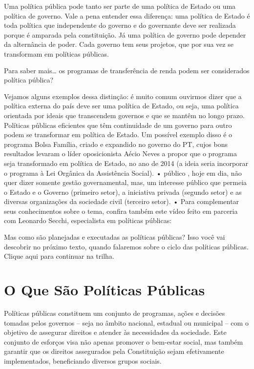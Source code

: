 \documentclass[
   article,       
   12pt,          
   oneside,       
   a4paper,       
   english,       
   brazil,        
   sumario=tradicional
   ]{abntex2}
\begin{document}
Uma política pública pode tanto ser parte de uma política de Estado ou uma política de governo. Vale a pena entender essa diferença: uma política de Estado é toda política que independente do governo e do governante deve ser realizada porque é amparada pela constituição. Já uma política de governo pode depender da alternância de poder. Cada governo tem seus projetos, que por sua vez se transformam em políticas públicas.

Para saber mais… os programas de transferência de renda podem ser considerados política pública?

Vejamos alguns exemplos dessa distinção: é muito comum ouvirmos dizer que a política externa do país deve ser uma política de Estado, ou seja, uma política orientada por ideais que transcendem governos e que se mantêm no longo prazo. Políticas públicas eficientes que têm continuidade de um governo para outro podem se transformar em política de Estado. Um possível exemplo disso é o programa Bolsa Família, criado e expandido no governo do PT, cujos bons resultados levaram o líder oposicionista Aécio Neves a propor que o programa seja transformado em política de Estado, no ano de 2014 (a ideia seria incorporar o programa à Lei Orgânica da Assistência Social).
• público , hoje em dia, não quer dizer somente gestão governamental, mas, um interesse público que permeia o Estado e o Governo (primeiro setor), a iniciativa privada (segundo setor) e as diversas organizações da sociedade civil (terceiro setor).
• Para complementar seus conhecimentos sobre o tema, confira também este vídeo feito em parceria com Leonardo Secchi, especialista em políticas públicas:

Mas como são planejadas e executadas as políticas públicas? Isso você vai descobrir no próximo texto, quando falaremos sobre o ciclo das políticas públicas. Clique aqui para continuar na trilha.

\section{O Que São Políticas Públicas}
Políticas públicas constituem um conjunto de programas, ações e decisões tomadas pelos governos – seja no âmbito nacional, estadual ou municipal – com o objetivo de assegurar direitos e atender às necessidades da sociedade. Este conjunto de esforços visa não apenas promover o bem-estar social, mas também garantir que os direitos assegurados pela Constituição sejam efetivamente implementados, beneficiando diversos grupos sociais.
\end{document}
